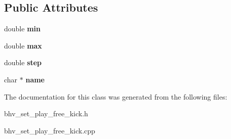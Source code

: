 \subsection*{Public Attributes}
\begin{DoxyCompactItemize}
\item 
\hypertarget{classParamMembershipFunction_aa99a86116dc625f66b229da10693d63e}{
double {\bfseries min}}
\label{classParamMembershipFunction_aa99a86116dc625f66b229da10693d63e}

\item 
\hypertarget{classParamMembershipFunction_a93747ad66e2a5f8b5470c4215cd09ce3}{
double {\bfseries max}}
\label{classParamMembershipFunction_a93747ad66e2a5f8b5470c4215cd09ce3}

\item 
\hypertarget{classParamMembershipFunction_aae7b5cd4b4c778697edd53c9ff4297a8}{
double {\bfseries step}}
\label{classParamMembershipFunction_aae7b5cd4b4c778697edd53c9ff4297a8}

\item 
\hypertarget{classParamMembershipFunction_afb9b6b203f6d69ab66aafbf650642b14}{
char $\ast$ {\bfseries name}}
\label{classParamMembershipFunction_afb9b6b203f6d69ab66aafbf650642b14}

\end{DoxyCompactItemize}


The documentation for this class was generated from the following files:\begin{DoxyCompactItemize}
\item 
bhv\_\-set\_\-play\_\-free\_\-kick.h\item 
bhv\_\-set\_\-play\_\-free\_\-kick.cpp\end{DoxyCompactItemize}
